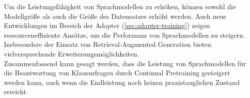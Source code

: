 Um die Leistungsfähigkeit von Sprachmodellen zu erhöhen, können sowohl die Modellgröße als auch die Größe des Datensatzes erhöht werden.
Auch neue Entwicklungen im Bereich der Adapter (\cref{sec:adapter-training}) zeigen ressourceneffiziente Ansätze, um die Performanz von Sprachmodellen zu steigern.
Insbesondere der Einsatz von Retrieval-Augmented Generation bieten vielversprechende Erweiterungsmöglichkeiten.\\

Zusammenfassend kann gesagt werden, dass die Leistung von Sprachmodellen für die Beantwortung von Klausurfragen durch Continual Pretraining gesteigert werden kann, auch wenn die Endleistung noch keinen praxistauglichen Zustand erreicht.\\

\vfill
